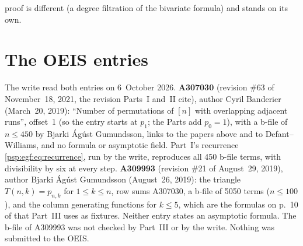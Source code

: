 \documentclass[11pt,letterpaper]{article}
\numberwithin{equation}{section}
\theoremstyle{remark}\newtheorem{remark}[theorem]{Remark}
\begin{document}
proof is different (a degree filtration of the bivariate formula) and stands on its own.

\section*{The OEIS entries}\label{psp:sec:oeis}
The write read both entries on 6~October 2026. \textbf{A307030} \cite{oeisA307030} (revision \#63 of November~18, 2021, the revision Parts~I and~II cite), author Cyril Banderier (March~20, 2019): ``Number of permutations of $[n]$ with overlapping adjacent runs'', offset~1 (so the entry starts at $p_1$; the Parts add $p_0=1$), with a b-file of $n\le450$ by Bjarki \'Ag\'ust Gu\dh mundsson, links to the papers above and to Defant--Williams, and no formula or asymptotic field. Part~I's recurrence \eqref{psp:egf:eq:recurrence}, run by the write, reproduces all 450 b-file terms, with divisibility by six at every step. \textbf{A309993} \cite{oeisA309993} (revision \#21 of August~29, 2019), author Bjarki \'Ag\'ust Gu\dh mundsson (August~26, 2019): the triangle $T(n,k)=p_{n,k}$ for $1\le k\le n$, row sums A307030, a b-file of 5050 terms ($n\le100$), and the column generating functions for $k\le5$, which are the formulas on p.~10 of \cite{abh} that Part~III uses as fixtures. Neither entry states an asymptotic formula. The b-file of A309993 was not checked by Part~III or by the write. Nothing was submitted to the OEIS.
\end{document}
